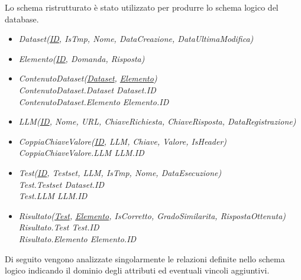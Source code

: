 Lo schema ristrutturato è stato utilizzato per produrre lo schema logico del database.
\begin{itemize}
    \item[] \textit{Dataset(\underline{ID}, IsTmp, Nome, DataCreazione, DataUltimaModifica)}
    
    \item[] \textit{Elemento(\underline{ID}, Domanda, Risposta)}
    
    \item[] \textit{ContenutoDataset(\underline{Dataset}, \underline{Elemento})} \\
    \textit{ContenutoDataset.Dataset \textrightarrow Dataset.ID} \\
    \textit{ContenutoDataset.Elemento \textrightarrow Elemento.ID}
    
    \item[] \textit{LLM(\underline{ID}, Nome, URL, ChiaveRichiesta, ChiaveRisposta, DataRegistrazione)}
    
    \item[] \textit{CoppiaChiaveValore(\underline{ID}, LLM, Chiave, Valore, IsHeader)}\\
    \textit{CoppiaChiaveValore.LLM \textrightarrow LLM.ID}

    \item[] \textit{Test(\underline{ID}, Testset, LLM, IsTmp, Nome, DataEsecuzione)} \\
    \textit{Test.Testset \textrightarrow Dataset.ID} \\
    \textit{Test.LLM \textrightarrow LLM.ID}
    
    \item[] \textit{Risultato(\underline{Test}, \underline{Elemento}, IsCorretto, GradoSimilarita, RispostaOttenuta)}\\
    \textit{Risultato.Test \textrightarrow Test.ID} \\
    \textit{Risultato.Elemento \textrightarrow Elemento.ID} 
\end{itemize}
Di seguito vengono analizzate singolarmente le relazioni definite nello schema logico indicando il dominio degli attributi ed eventuali vincoli aggiuntivi.

